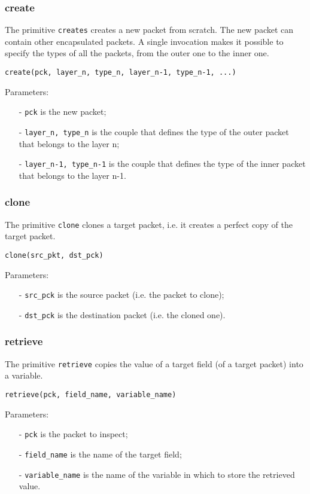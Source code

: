 \subsubsection{create}
The primitive \texttt{creates} creates a new packet from scratch. The new packet can contain other encapsulated packets. A single invocation makes it possible to specify the types of all the packets, from the outer one to the inner one.
%
\begin{lstlisting}[language={adl}]
create(pck, layer_n, type_n, layer_n-1, type_n-1, ...)
\end{lstlisting}
%
Parameters:
%
\begin{itemize}
\item[-] \texttt{pck} is the new packet;
\item[-] \texttt{layer\_n, type\_n} is the couple that defines the type of the outer packet that belongs to the layer n;
\item[-] \texttt{layer\_n-1, type\_n-1} is the couple that defines the type of the inner packet that belongs to the layer n-1.
\end{itemize}

\subsubsection{clone}
The primitive \texttt{clone} clones a target packet, i.e. it creates a perfect copy of the target packet.
%
\begin{lstlisting}[language={adl}]
clone(src_pkt, dst_pck)
\end{lstlisting}
%
Parameters:
%
\begin{itemize}
\item[-] \texttt{src\_pck} is the source packet (i.e. the packet to clone);
\item[-] \texttt{dst\_pck} is the destination packet (i.e. the cloned one).
\end{itemize}

\subsubsection{retrieve}
The primitive \texttt{retrieve} copies the value of a target field (of a target packet) into a variable.
%
\begin{lstlisting}[language={adl}]
retrieve(pck, field_name, variable_name)
\end{lstlisting}
%
Parameters:
%
\begin{itemize}
\item[-] \texttt{pck} is the packet to inspect;
\item[-] \texttt{field\_name} is the name of the target field;
\item[-] \texttt{variable\_name} is the name of the variable in which to store the retrieved value.
\end{itemize}

